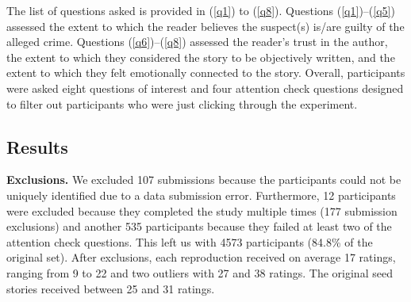 \documentclass[10pt,letterpaper]{article}
\begin{document}
The list of questions asked is provided in (\ref{q1}) to (\ref{q8}). Questions (\ref{q1})--(\ref{q5}) assessed the extent to which the reader believes the suspect(s) is/are guilty of the alleged crime. Questions (\ref{q6})--(\ref{q8}) assessed the  reader's trust in the author, the extent to which they considered the story to be objectively written, and the extent to which they felt emotionally connected to the story. Overall, participants were asked eight questions of interest and four attention check questions designed to filter out participants who were just clicking through the experiment. %

\vspace{-.5cm}
\vspace{-.5cm}
\vspace{-.5cm}
\vspace{-.5cm}
\vspace{-.5cm}
\vspace{-.5cm}
\vspace{-.5cm}


\subsection{Results}

\textbf{Exclusions.} We excluded 107 submissions because the participants could not be uniquely identified due to a data submission error. Furthermore, 12 participants were excluded because they completed the study multiple times (177 submission exclusions) and another 535 participants because they failed at least two of the attention check questions. This left us with 4573 participants (84.8\% of the original set). After exclusions, each reproduction received on average 17 ratings, ranging from 9 to 22 and two outliers with 27 and 38 ratings. %
The original seed stories received between 25 and 31 ratings.
\end{document}
